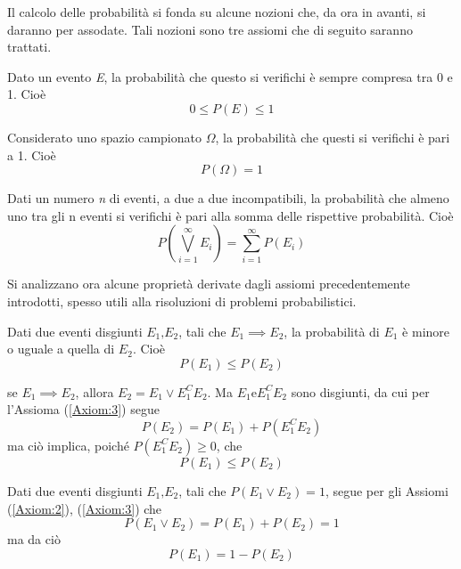 \documentclass{subfiles}
\begin{document}
Il calcolo delle probabilità si fonda su alcune nozioni che, da ora in avanti, si daranno per assodate.
Tali nozioni sono tre assiomi che di seguito saranno trattati.

\begin{Axiom}\label{Axiom:1}
    Dato un evento \emph{E}, la probabilità che questo si verifichi è sempre compresa tra 0 e 1. Cioè
    \[
        0 \le P(E) \le 1
    \]
\end{Axiom}

\begin{Axiom}\label{Axiom:2}
    Considerato uno spazio campionato \(\Omega\), la probabilità che questi si verifichi è pari a 1. Cioè
    \[
        P(\Omega) = 1
    \]
\end{Axiom}

\begin{Axiom}\label{Axiom:3}
    Dati un numero \emph{n} di eventi, a due a due incompatibili, la probabilità che almeno uno tra gli n eventi si verifichi è pari alla somma delle rispettive probabilità. Cioè
    \[
        P \left( \bigvee\limits_{i = 1}^{\infty}{E_{i}} \right) = \sum\limits_{i = 1}^{\infty}{P(E_{i})}
    \]
\end{Axiom}
\noindent
Si analizzano ora alcune proprietà derivate dagli assiomi precedentemente introdotti, spesso utili alla risoluzioni di problemi probabilistici.
\begin{Proposition}
    Dati due eventi disgiunti \(E_{1} \text{,} E_{2}\), tali che \(E_{1} \implies E_{2}\), la probabilità di \(E_{1}\) è minore o uguale a quella di \(E_{2}\). Cioè
    \[
        P(E_{1}) \le P(E_{2})
    \]

    \begin{Proof*}
        se \(E_{1} \implies E_{2}\), allora \(E_{2} = E_{1} \lor E_{1}^{C}E_{2}\).
        Ma \(E_{1} \text{e} E_{1}^{C}E_{2}\) sono disgiunti, da cui per l'Assioma (\ref{Axiom:3}) segue
        \[
            P(E_{2}) = P(E_{1}) + P(E_{1}^{C}E_{2})
        \]
        ma ciò implica, poiché \(P(E_{1}^{C}E_{2}) \ge 0\), che
        \[
            P(E_{1}) \le P(E_{2})
        \]
    \end{Proof*}
\end{Proposition}

\begin{Proposition}
    Dati due eventi disgiunti \(E_{1} \text{,} E_{2}\), tali che \(P(E_{1} \lor E_{2}) = 1\), segue per gli Assiomi (\ref{Axiom:2}), (\ref{Axiom:3}) che
    \[
        P(E_{1} \lor E_{2}) = P(E_{1}) + P(E_{2}) = 1
    \]
    ma da ciò
    \[
        P(E_{1}) = 1 - P(E_{2})
    \]
\end{Proposition}
\end{document}
